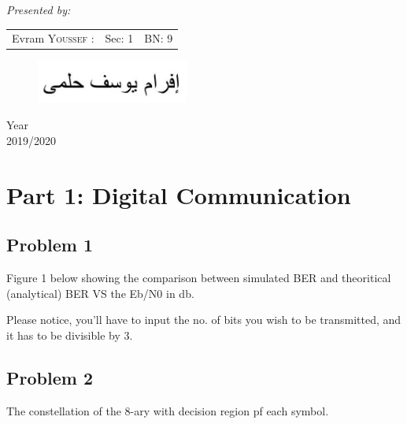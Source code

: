 \documentclass[a4paper,12pt]{report}
\begin{document}
\begin{titlepage}
\begin{center}
    \vspace{2cm}
    
    
    {\huge \textit{Presented by: }}\\[0.5cm]
    
    \color{black}
    \centering
    \begin{tabular}{lll}
    \large Evram \textsc{Youssef} : & \large Sec: 1 & \large BN: 9 \\[0.1cm]
    
    \end{tabular}

    \vspace{-0.5cm}

    \begin{figure}[h]
        \centerline{\includegraphics[width=5cm]{Figures/evram.JPG}}
    \end{figure}

    {\LARGE {Year}\\ 2019/2020}
    \end{center}
    \end{titlepage}


    \newpage

    \tableofcontents
    \listoffigures
    \newpage


    \section{Part 1: Digital Communication}
        
    \subsection{Problem 1}
        Figure 1 below showing the comparison between simulated BER and theoritical (analytical) BER
        VS the Eb/N0 in db.

        Please notice, you'll have to input the no. 
            of bits you wish to be transmitted, and it has to be divisible by 3.

    \subsection{Problem 2}
        The constellation of the 8-ary with decision region pf each symbol.
\end{document}
